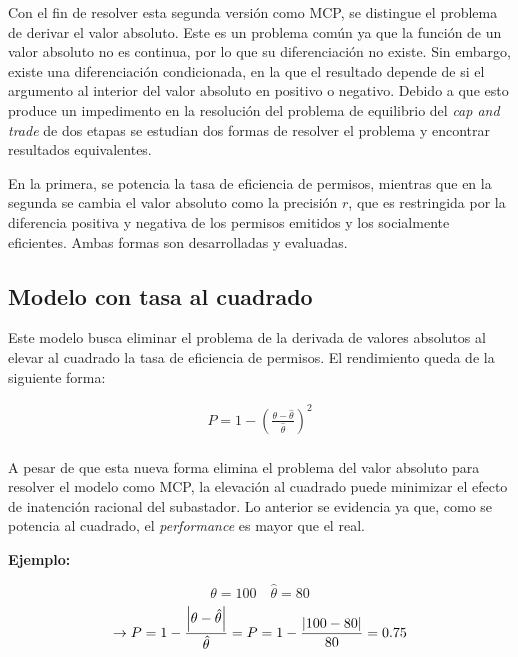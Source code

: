 Con el fin de resolver esta segunda versión como MCP, se distingue el problema de derivar el valor absoluto. Este es un problema común ya que la función de un valor absoluto no es continua, por lo que su diferenciación no existe. Sin embargo, existe una diferenciación condicionada, en la que el resultado depende de si el argumento al interior del valor absoluto en positivo o negativo. Debido a que esto produce un impedimento en la resolución del problema de equilibrio del \textit{cap and trade} de dos etapas se estudian dos formas de resolver el problema y encontrar resultados equivalentes. 
\vspace{2.5mm}

En la primera, se potencia la tasa de eficiencia de permisos, mientras que en la segunda se cambia el valor absoluto como la precisión $r$, que es restringida por la diferencia positiva y negativa de los permisos emitidos y los socialmente eficientes. Ambas formas son desarrolladas y evaluadas.

\subsection{Modelo con tasa al cuadrado}\label{tasacuadrada}

Este modelo busca eliminar el problema de la derivada de valores absolutos al elevar al cuadrado la tasa de eficiencia de permisos. El rendimiento queda de la siguiente forma:  
\vspace{2.5mm}

\begin{equation}
\begin{array}{rrclcl}
\displaystyle P = 1- \left(\frac{{\theta - \hat{\theta}}}{\hat{\theta}}\right)^2 \\
\end{array}
\end{equation}

A pesar de que esta nueva forma elimina el problema del valor absoluto para resolver el modelo como MCP, la elevación al cuadrado puede minimizar el efecto de inatención racional del subastador. Lo anterior se evidencia ya que, como se potencia al cuadrado, el \textit{performance} es mayor que el real. 
\vspace{2.5mm}

\textbf{Ejemplo:}

$$\theta= 100 \quad \hat{\theta}=80$$
$$\rightarrow P= 1 - \frac{\abs{\theta-\hat{\theta}}}{\hat{\theta}}=P= 1 - \frac{\abs{100-80}}{80} = 0.75$$


